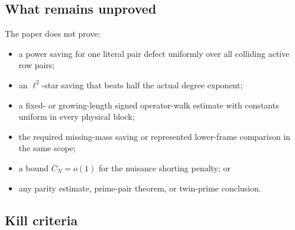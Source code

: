 \subsection{What remains unproved}

The paper does not prove:
\begin{itemize}
 \item a power saving for one literal pair defect uniformly over all
       colliding active row pairs;
 \item an \(\ell^2\)-star saving that beats half the actual degree exponent;
 \item a fixed- or growing-length signed operator-walk estimate with
       constants uniform in every physical block;
 \item the required missing-mass saving or represented lower-frame
       comparison in the same scope;
 \item a bound \(C_N=o(1)\) for the nuisance shorting penalty; or
 \item any parity estimate, prime-pair theorem, or twin-prime conclusion.
\end{itemize}

\subsection{Kill criteria}

